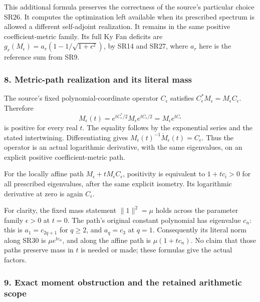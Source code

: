 \documentclass{article}
\begin{document}
This additional formula preserves the correctness of the source's particular choice SR26. It computes the optimization left available when its prescribed spectrum is allowed a different self-adjoint realization. It remains in the same positive coefficient-metric family. Its full Ky Fan deficits are \(g_r(M_\epsilon)=a_r(1-1/\sqrt{1+\epsilon^2})\), by SR14 and SR27, where \(a_r\) here is the reference sum from SR9.

\subsubsection{8. Metric-path realization and its literal mass}\label{endpoint-four_window_sharpness_review--metric-path-realization-and-its-literal-mass}

The source's fixed polynomial-coordinate operator \(C_\epsilon\) satisfies \(C_\epsilon^*M_\epsilon=M_\epsilon C_\epsilon\). Therefore \[
M_\epsilon(t)
=e^{tC_\epsilon^*/2}M_\epsilon e^{tC_\epsilon/2}
=M_\epsilon e^{tC_\epsilon}
\tag{SR30}
\] is positive for every real \(t\). The equality follows by the exponential series and the stated intertwining. Differentiating gives \(M_\epsilon(t)^{-1}\dot M_\epsilon(t)=C_\epsilon\). Thus the operator is an actual logarithmic derivative, with the same eigenvalues, on an explicit positive coefficient-metric path.

For the locally affine path \(M_\epsilon+tM_\epsilon C_\epsilon\), positivity is equivalent to \(1+tc_i>0\) for all prescribed eigenvalues, after the same explicit isometry. Its logarithmic derivative at zero is again \(C_\epsilon\).

For clarity, the fixed mass statement \(\|1\|^2=\mu\) holds across the parameter family \(\epsilon>0\) at \(t=0\). The path's original constant polynomial has eigenvalue \(c_n\): this is \(a_1=c_{2q+1}\) for \(q\ge2\), and \(a_q=c_3\) at \(q=1\). Consequently its literal norm along SR30 is \(\mu e^{tc_n}\), and along the affine path is \(\mu(1+tc_n)\). No claim that those paths preserve mass in \(t\) is needed or made; these formulas give the actual factors.

\subsubsection{9. Exact moment obstruction and the retained arithmetic scope}\label{endpoint-four_window_sharpness_review--exact-moment-obstruction-and-the-retained-arithmetic-scope}
\end{document}
